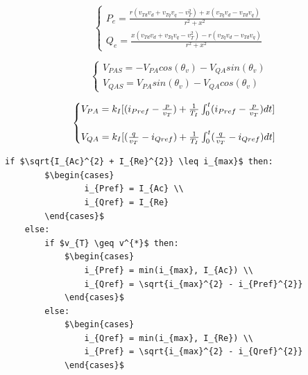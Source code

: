 \begin{equation*}
	\begin{cases}
		P_{e} = \frac{r(v_{Td}v_{d} + v_{Tq}v_{q} - v_{T}^{2}) + x(v_{Tq}v_{d} - v_{Td}v_{q})}{r^{2} + x^{2}} \\
		Q_{e} = \frac{x(v_{Td}v_{d} + v_{Tq}v_{q} - v_{T}^{2}) - r(v_{Tq}v_{d} - v_{Td}v_{q})}{r^{2} + x^{2}}
	\end{cases}
\end{equation*}

\begin{equation*}
	\begin{cases}
		V_{PAS} = -V_{PA}cos(\theta_{v}) - V_{QA}sin(\theta_{v}) \\
		V_{QAS} = V_{PA}sin(\theta_{v}) - V_{QA}cos(\theta_{v})
	\end{cases}
\end{equation*}

\begin{equation*}
	\begin{cases}
		V_{PA} = k_{I}[(i_{Pref} - \frac{p}{v_{T}}) +\frac{1}{T_{I}}\int\displaylimits_{0}^{t}	(i_{Pref} - \frac{p}{v_{T}})dt]\\
		\\
		V_{QA} = k_{I}[(\frac{q}{v_{T}} - i_{Qref}) +\frac{1}{T_{I}}\int\displaylimits_{0}^{t}	(\frac{q}{v_{T}} - i_{Qref})dt]
	\end{cases}
\end{equation*}

\begin{center}
	\begin{lstlisting}[mathescape, columns=fullflexible]
	if $\sqrt{I_{Ac}^{2} + I_{Re}^{2}} \leq i_{max}$ then:
		$\begin{cases}
				i_{Pref} = I_{Ac} \\
				i_{Qref} = I_{Re}
		\end{cases}$
	else:
		if $v_{T} \geq v^{*}$ then:	
			$\begin{cases}
				i_{Pref} = min(i_{max}, I_{Ac}) \\
				i_{Qref} = \sqrt{i_{max}^{2} - i_{Pref}^{2}}
			\end{cases}$
		else:
			$\begin{cases}
				i_{Qref} = min(i_{max}, I_{Re}) \\
				i_{Pref} = \sqrt{i_{max}^{2} - i_{Qref}^{2}}
			\end{cases}$
	\end{lstlisting}
\end{center}

